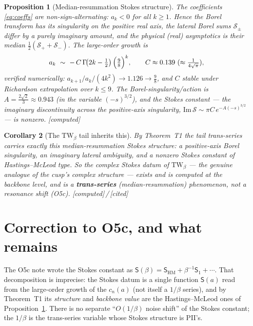 \documentclass[11pt,reqno]{amsart}
\theoremstyle{plain}\newtheorem{proposition}{Proposition}\newtheorem{corollary}[proposition]{Corollary}
\theoremstyle{remark}\newtheorem{remark}[proposition]{Remark}
\newcommand{\OK}{{\footnotesize\textsf{[computed]}}}\newcommand{\cited}{{\footnotesize\textsf{[cited]}}}
\begin{document}
\begin{proposition}[Median-resummation Stokes structure]\label{prop:stokes}
The coefficients \eqref{eq:coeffs} are \emph{non-sign-alternating}: $a_k<0$ for all $k\ge1$. Hence
the Borel transform has its singularity on the positive real axis, the lateral Borel sums
$\mathcal S_\pm$ differ by a purely imaginary amount, and the physical (real) asymptotics is their
median $\tfrac12(\mathcal S_++\mathcal S_-)$. The large-order growth is
\begin{equation}\label{eq:growth}
a_k\ \sim\ -\,C\,\Gamma\!\bigl(2k-\tfrac12\bigr)\,\Bigl(\tfrac98\Bigr)^{k},\qquad
C\approx0.139\ (\approx\tfrac1{4\sqrt\pi}),
\end{equation}
verified numerically: $a_{k+1}/a_k/(4k^2)\to1.126\to\tfrac98$, and $C$ stable under Richardson
extrapolation over $k\le9$. The Borel-singularity/action is $A=\tfrac{2\sqrt2}{3}\approx0.943$ (in
the variable $(-s)^{3/2}$), and the Stokes constant --- the imaginary discontinuity across the
positive-axis singularity, $\mathrm{Im}\,\mathcal S\sim\pi C\,e^{-A(-s)^{3/2}}$ --- is nonzero.
\OK
\end{proposition}

\begin{corollary}[The $\mathrm{TW}_\beta$ tail inherits this]\label{cor:inherit}
By Theorem~T1 the tail trans-series carries exactly this median-resummation Stokes structure: a
positive-axis Borel singularity, an imaginary lateral ambiguity, and a nonzero Stokes constant of
Hastings--McLeod type. So the complex Stokes datum of $\mathrm{TW}_\beta$ --- the genuine analogue
of the cusp's complex structure --- \emph{exists and is computed at the backbone level}, and is a
\textbf{trans-series} (median-resummation) phenomenon, not a resonance shift (O5c). \OK\,/\,\cited
\end{corollary}

\section{Correction to O5c, and what remains}

The O5c note wrote the Stokes constant as $\mathsf S(\beta)=\mathsf S_{\mathrm{HM}}+\beta^{-1}\mathsf
S_1+\cdots$. That decomposition is imprecise: the Stokes datum is a single function $\mathsf S(a)$
read from the large-order growth of the $c_n(a)$ (not itself a $1/\beta$ series), and by
Theorem~T1 its \emph{structure} and \emph{backbone value} are the Hastings--McLeod ones of
Proposition~\ref{prop:stokes}. There is no separate ``$O(1/\beta)$ noise shift'' of the Stokes
constant; the $1/\beta$ is the trans-series variable whose Stokes structure is PII's.
\end{document}
